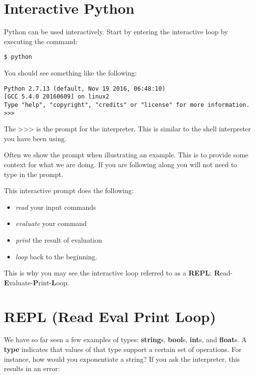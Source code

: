 \FILENAME

\section{Interactive Python}\label{interactive-python}

Python can be used interactively. Start by entering the interactive loop
by executing the command:

\begin{verbatim}
$ python
\end{verbatim}

You should see something like the following:

\begin{verbatim}
Python 2.7.13 (default, Nov 19 2016, 06:48:10)
[GCC 5.4.0 20160609] on linux2
Type "help", "copyright", "credits" or "license" for more information.
>>>
\end{verbatim}

The \textgreater{}\textgreater{}\textgreater{} is the prompt for the
interpreter. This is similar to the shell interpreter you have been
using.

Often we show the prompt when illustrating an example. This is to
provide some context for what we are doing. If you are following along
you will not need to type in the prompt.

This interactive prompt does the following:

\begin{itemize}
\tightlist
\item
  \emph{read} your input commands
\item
  \emph{evaluate} your command
\item
  \emph{print} the result of evaluation
\item
  \emph{loop} back to the beginning.
\end{itemize}

This is why you may see the interactive loop referred to as a
\textbf{REPL}:
\textbf{R}ead-\textbf{E}valuate-\textbf{P}rint-\textbf{L}oop.

\section{REPL (Read Eval Print Loop)}\label{repl-read-eval-print-loop}

We have so far seen a few examples of types: \textbf{string}s,
\textbf{bool}s, \textbf{int}s, and \textbf{float}s. A \textbf{type}
indicates that values of that type support a certain set of operations.
For instance, how would you exponentiate a string? If you ask the
interpreter, this results in an error:

